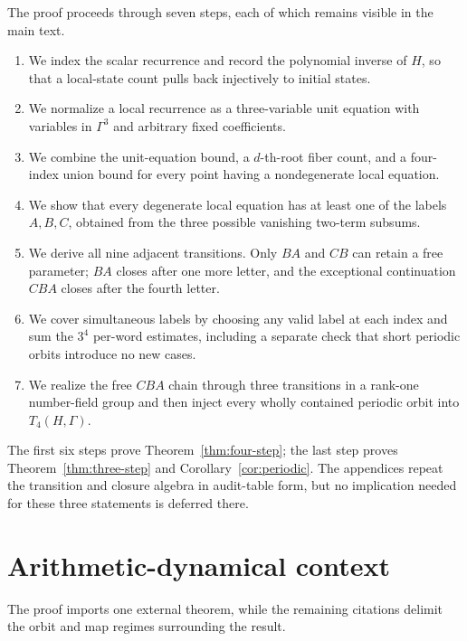 \documentclass[11pt]{article}
\theoremstyle{definition}
\theoremstyle{remark}
\begin{document}
The proof proceeds through seven steps, each of which remains visible in the
main text.
\begin{enumerate}
\item We index the scalar recurrence and record the polynomial inverse of
      \(H\), so that a local-state count pulls back injectively to initial
      states.
\item We normalize a local recurrence as a three-variable unit equation with
      variables in \(\Gamma^3\) and arbitrary fixed coefficients.
\item We combine the unit-equation bound, a \(d\)-th-root fiber count, and a
      four-index union bound for every point having a nondegenerate local
      equation.
\item We show that every degenerate local equation has at least one of the
      labels \(A,B,C\), obtained from the three possible vanishing
      two-term subsums.
\item We derive all nine adjacent transitions.  Only \(BA\) and \(CB\) can
      retain a free parameter; \(BA\) closes after one more letter, and the
      exceptional continuation \(CBA\) closes after the fourth letter.
\item We cover simultaneous labels by choosing any valid label at each
      index and sum the \(3^4\) per-word estimates, including a separate
      check that short periodic orbits introduce no new cases.
\item We realize the free \(CBA\) chain through three transitions in a
      rank-one number-field group and then inject every wholly contained
      periodic orbit into \(T_4(H,\Gamma)\).
\end{enumerate}
The first six steps prove Theorem~\ref{thm:four-step}; the last step proves
Theorem~\ref{thm:three-step} and Corollary~\ref{cor:periodic}.  The
appendices repeat the transition and closure algebra in audit-table form,
but no implication needed for these three statements is deferred there.

\section{Arithmetic-dynamical context}\label{sec:context}

The proof imports one external theorem, while the remaining citations delimit
the orbit and map regimes surrounding the result.
\end{document}
